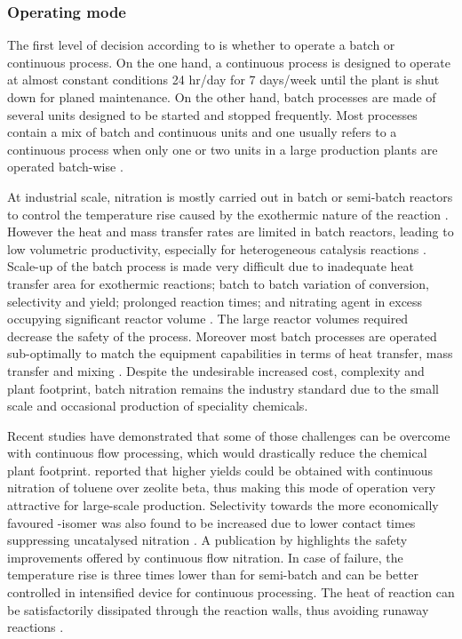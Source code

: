 \subsubsection{Operating mode} %
\label{sec:continuous}
The first level of decision according to \textcite{douglas_conceptual_1988} is whether to operate a batch or continuous process. On the one hand, a continuous process is designed to operate at almost constant conditions 24 hr/day for 7 days/week until the plant is shut down for planed maintenance. On the other hand, batch processes are made of several units designed to be started and stopped frequently. Most processes contain a mix of batch and continuous units and one usually refers to a continuous process when only one or two units in a large production plants are operated batch-wise \cite{douglas_conceptual_1988}. 

At industrial scale, nitration is mostly carried out in batch or semi-batch reactors to control the temperature rise caused by the exothermic nature of the reaction \cite{booth_nitro_2000,dugal_nitrobenzene_2005}. However the heat and mass transfer rates are limited in batch reactors, leading to low volumetric productivity, especially for heterogeneous catalysis reactions \cite{randall_process_2020}. Scale-up of the batch process is made very difficult due to inadequate heat transfer area for exothermic reactions; batch to batch variation of conversion, selectivity and yield; prolonged reaction times; and nitrating agent in excess occupying significant reactor volume \cite{kulkarni_continuous_2014}. The large reactor volumes required decrease the safety of the process. Moreover most batch processes are operated sub-optimally to match the equipment capabilities in terms of heat transfer, mass transfer and mixing \cite{randall_process_2020}. Despite the undesirable increased cost, complexity and plant footprint, batch nitration remains the industry standard due to the small scale and occasional production of speciality chemicals. 

Recent studies have demonstrated that some of those challenges can be overcome with continuous flow processing, which would drastically reduce the chemical plant footprint. \textcite{kuba_batch_2007} reported that higher yields could be obtained with continuous nitration of toluene over zeolite beta, thus making this mode of operation very attractive for large-scale production. Selectivity towards the more economically favoured \para-isomer was also found to be increased due to lower contact times suppressing uncatalysed nitration \cite{kuba_batch_2007}. A publication by \textcite{di_miceli_raimondi_safety_2015} highlights the safety improvements offered by continuous flow nitration. In case of failure, the temperature rise is three times lower than for semi-batch and can be better controlled in intensified device for continuous processing. The heat of reaction can be satisfactorily dissipated through the reaction walls, thus avoiding runaway reactions \cite{di_miceli_raimondi_safety_2015}. 

